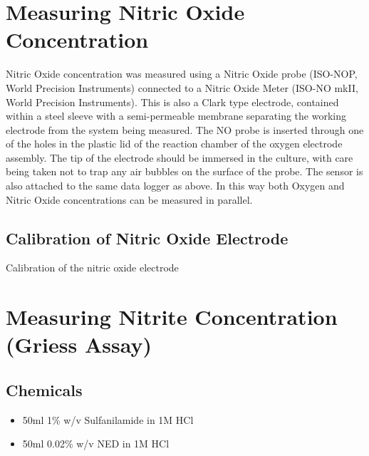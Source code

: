 \section{Measuring Nitric Oxide Concentration}
Nitric Oxide concentration was measured using a Nitric Oxide probe (ISO-NOP, World Precision Instruments) connected to a Nitric Oxide Meter (ISO-NO mkII, World Precision Instruments). This is also a Clark type electrode, contained within a steel sleeve with a semi-permeable membrane separating the working electrode from the system being measured\cite{Liu2005,Bedioui2003,Serpe2007}. The NO probe is inserted through one of the holes in the plastic lid of the reaction chamber of the oxygen electrode assembly. The tip of the electrode should be immersed in the culture, with care being taken not to trap any air bubbles on the surface of the probe. The sensor is also attached to the same data logger as above. In this way both Oxygen and Nitric Oxide concentrations can be measured in parallel.
\subsection{Calibration of Nitric Oxide Electrode}
Calibration of the nitric oxide electrode 

\section{Measuring Nitrite Concentration (Griess Assay)}
\cite{DonaldNicholas1957}
\subsection*{Chemicals}
\begin{itemize}
 \item 50ml 1\% w/v Sulfanilamide in 1M HCl
 \item 50ml 0.02\% w/v NED in 1M HCl
\end{itemize}


